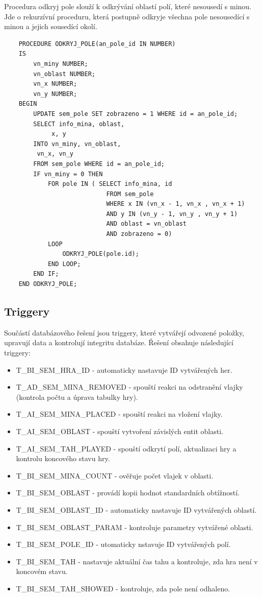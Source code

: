 \documentclass[12pt, a4paper]{article}
\begin{document}
Procedura odkryj pole slouží k odkrývání oblastí polí, které nesousedí s minou. Jde o rekurzívní proceduru, která postupně odkryje všechna pole nesousedící s minou a jejich sousedící okolí.

\begin{verbatim}
    PROCEDURE ODKRYJ_POLE(an_pole_id IN NUMBER)
    IS
        vn_miny NUMBER;
        vn_oblast NUMBER;
        vn_x NUMBER;
        vn_y NUMBER;
    BEGIN
        UPDATE sem_pole SET zobrazeno = 1 WHERE id = an_pole_id;
        SELECT info_mina, oblast,
        	 x, y 
        INTO vn_miny, vn_oblast,
         vn_x, vn_y
        FROM sem_pole WHERE id = an_pole_id;
        IF vn_miny = 0 THEN
            FOR pole IN ( SELECT info_mina, id 
                            FROM sem_pole 
                            WHERE x IN (vn_x - 1, vn_x , vn_x + 1) 
                            AND y IN (vn_y - 1, vn_y , vn_y + 1) 
                            AND oblast = vn_oblast
                            AND zobrazeno = 0)
            LOOP
                ODKRYJ_POLE(pole.id);
            END LOOP;
        END IF;
    END ODKRYJ_POLE;
\end{verbatim} 
   

\subsection{Triggery}

Součástí databázového řešení jsou triggery, které vytvářejí odvozené položky, upravují data a kontrolují integritu databáze. Řešení obsahuje následující triggery:

\begin{itemize}
\item T\_BI\_SEM\_HRA\_ID - automaticky nastavuje ID vytvářených her.
\item T\_AD\_SEM\_MINA\_REMOVED - spouští reakci na odstranění vlajky (kontrola počtu a úprava tabulky hry).
\item T\_AI\_SEM\_MINA\_PLACED - spouští reakci na vložení vlajky.
\item T\_AI\_SEM\_OBLAST - spouští vytvoření závislých entit oblasti.
\item T\_AI\_SEM\_TAH\_PLAYED - spouští odkrytí polí, aktualizaci hry a kontrolu koncového stavu hry. 
\item T\_BI\_SEM\_MINA\_COUNT - ověřuje počet vlajek v oblasti.
\item T\_BI\_SEM\_OBLAST - provádí kopii hodnot standardních obtížností.
\item T\_BI\_SEM\_OBLAST\_ID - automaticky nastavuje ID vytvářených oblastí.
\item T\_BI\_SEM\_OBLAST\_PARAM - kontroluje parametry vytvářené oblasti.
\item T\_BI\_SEM\_POLE\_ID - utomaticky nstavuje ID vytvářených polí.
\item T\_BI\_SEM\_TAH - nastavuje aktuální čas tahu a kontroluje, zda hra není v koncovém stavu.
\item T\_BI\_SEM\_TAH\_SHOWED - kontroluje, zda pole není odhaleno. 
\end{itemize} 
\end{document}
